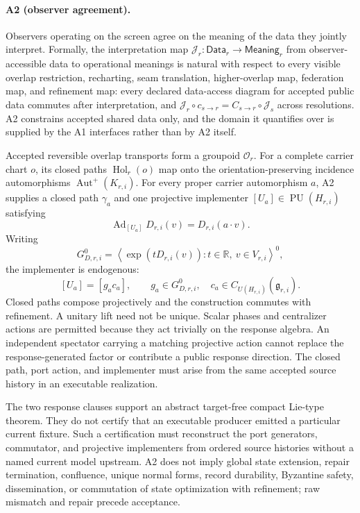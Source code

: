 \paragraph{A2 (observer agreement).}
Observers operating on the screen agree on the meaning of the data they
jointly interpret. Formally, the interpretation map
\(\mathcal J_r:\mathsf{Data}_r\to\mathsf{Meaning}_r\) from
observer-accessible data to operational meanings is natural with respect to
every visible overlap restriction, recharting, seam translation,
higher-overlap map, federation map, and refinement map: every declared
data-access diagram for accepted public data commutes after interpretation,
and \(\mathcal J_r\circ c_{s\to r}=C_{s\to r}\circ\mathcal J_s\) across
resolutions. A2 constrains accepted shared data only, and the domain
it quantifies over is supplied by the A1 interfaces rather than by A2
itself.

Accepted reversible overlap transports form a groupoid \(\mathcal O_r\).
For a complete carrier chart \(o\), its closed paths
\(\operatorname{Hol}_r(o)\) map onto the orientation-preserving incidence
automorphisms \(\operatorname{Aut}^{+}(K_{r,i})\). For every proper carrier
automorphism \(a\), A2 supplies a closed path \(\gamma_a\) and one
projective implementer
\([U_a]\in\operatorname{PU}(H_{r,i})\) satisfying
\[
\operatorname{Ad}_{[U_a]}D_{r,i}(v)=D_{r,i}(a\cdot v).
\]
Writing
\[
G_{D,r,i}^{0}
=
\left\langle
\exp(tD_{r,i}(v)):t\in\mathbb R,\ v\in V_{r,i}
\right\rangle^{0},
\]
the implementer is endogenous:
\[
[U_a]=[g_a c_a],
\qquad
g_a\in G_{D,r,i}^{0},
\quad
c_a\in C_{U(H_{r,i})}(\mathfrak g_{r,i}).
\]
Closed paths compose projectively and the construction commutes with
refinement. A unitary lift need not be unique. Scalar phases and centralizer
actions are permitted because they act trivially on the response algebra.
An independent spectator carrying a matching projective action cannot
replace the response-generated factor or contribute a public response
direction. The closed path, port action, and implementer must arise from the
same accepted source history in an executable realization.

The two response clauses support an abstract target-free compact Lie-type
theorem. They do not certify that an executable producer emitted a particular
current fixture. Such a certification must reconstruct the port generators,
commutator, and projective implementers from ordered source histories without
a named current model upstream. A2 does not imply global state
extension, repair termination, confluence, unique normal forms, record
durability, Byzantine safety, dissemination, or commutation of state
optimization with refinement; raw mismatch and repair precede acceptance.

